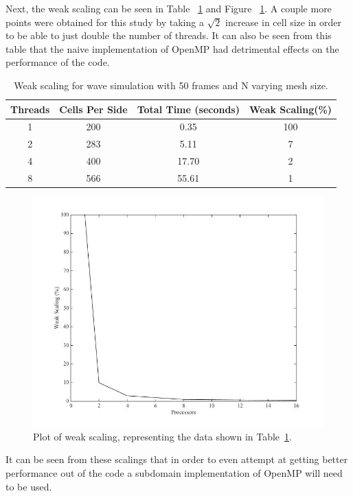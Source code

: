 \documentclass[12pt]{article}
\begin{document}
Next, the weak scaling can be seen in Table ~\ref{wscale_c} and Figure ~\ref{wsplot_c}. A couple more points were obtained for this study by taking a $\sqrt{2}$ increase in cell size in order to be able to just double the number of threads. It can also be seen from this table that the naive implementation of OpenMP had detrimental effects on the performance of the code.

\begin{table}[h]
	\begin{center}
		\begin{tabular}{|c c c c|}
			\hline
			Threads & Cells Per Side & Total Time (seconds) & Weak Scaling(\%) \\ \hline
			1 & 200 & 0.35 & 100   \\ \hline
			2 & 283 & 5.11 & 7 \\ \hline
			4 & 400 & 17.70 & 2   \\ \hline
			8 & 566 & 55.61 & 1   \\ \hline
		\end{tabular}
		\caption{Weak scaling for wave simulation with 50 frames and N varying mesh size.}
		\label{wscale_c}
	\end{center}
\end{table}

		\begin{figure}[h]
			\begin{center}
				\includegraphics[width=0.5\columnwidth]{wscale_plot}
				\caption{Plot of weak scaling, representing the data shown in Table~\ref{wscale_c}.}
				\label{wsplot_c}
			\end{center}
		\end{figure}

It can be seen from these scalings that in order to even attempt at getting better performance out of the code a subdomain implementation of OpenMP will need to be used.
\end{document}

